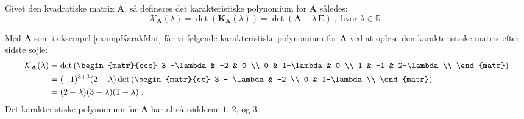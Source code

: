 \begin{definition} \label{tn5.defKarakPol}
Givet den kvadratiske matrix $\mathbf{A}$, så defineres det karakteristiske polynomium for $\mathbf{A}$ således:
\begin{equation}
\mathcal{K}_{\mathbf{A}}(\lambda) = \det(\mathbf{K}_{\mathbf{A}}(\lambda)) = \det(\mathbf{A} - \lambda\,\mathbf{E}) \;, \;\textrm{hvor} \;\lambda \in \mathbb{R} \;.
\end{equation}
\end{definition}





\begin{example}
Med  $\mathbf{A}$ som i eksempel \ref{exampKarakMat} får vi følgende karakteristiske polynomium for $\mathbf{A}$ ved at opløse den karakteristiske matrix efter sidste søjle:
\begin{equation}
\begin{aligned}
\mathcal{K}_{\mathbf{A}}(\lambda) &= \det\left(\begin{matr}{ccc}
            3 -\lambda & -2 & 0 \\
             0 & 1-\lambda  & 0 \\
             1 & -1 & 2-\lambda  \\
           \end{matr}\right) \\
&= (-1)^{3+3}(2-\lambda) \det \left(\begin{matr}{cc}
                     3 - \lambda & -2 \\
                     0 & 1-\lambda \\
                   \end{matr}
\right) \\
&= (2-\lambda)(3 - \lambda)(1-\lambda) \;.
\end{aligned}
\end{equation}
Det karakteristiske polynomium for  $\mathbf{A}$ har altså rødderne $1$, $2$, og $3$.
\end{example}

